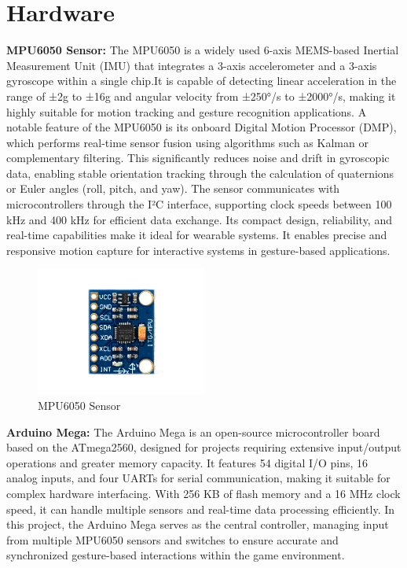 \section{Hardware}

\textbf{MPU6050 Sensor:} The MPU6050 is a widely used 6-axis MEMS-based Inertial Measurement Unit (IMU) that integrates a 3-axis accelerometer and a 3-axis gyroscope within a single chip.It is capable of detecting linear acceleration in the range of ±2g to ±16g and angular velocity from ±250°/s to ±2000°/s, making it highly suitable for motion tracking and gesture recognition applications. A notable feature of the MPU6050 is its onboard Digital Motion Processor (DMP), which performs real-time sensor fusion using algorithms such as Kalman or complementary filtering. This significantly reduces noise and drift in gyroscopic data, enabling stable orientation tracking through the calculation of quaternions or Euler angles (roll, pitch, and yaw). The sensor communicates with microcontrollers through the I²C interface, supporting clock speeds between 100 kHz and 400 kHz for efficient data exchange. Its compact design, reliability, and real-time capabilities make it ideal for wearable systems. It enables precise and responsive motion capture for interactive systems in gesture-based applications.

\begin{figure}[htbp!]
\centering
\includegraphics[width=0.5\textwidth]{images/3.1.png}
\caption{MPU6050 Sensor}
\label{fig:3.1}
\end{figure}

\vspace{1.5\baselineskip} %

\textbf{Arduino Mega:} The Arduino Mega is an open-source microcontroller board based on the ATmega2560, designed for projects requiring extensive input/output operations and greater memory capacity. It features 54 digital I/O pins, 16 analog inputs, and four UARTs for serial communication, making it suitable for complex hardware interfacing. With 256 KB of flash memory and a 16 MHz clock speed, it can handle multiple sensors and real-time data processing efficiently. In this project, the Arduino Mega serves as the central controller, managing input from multiple MPU6050 sensors and switches to ensure accurate and synchronized gesture-based interactions within the game environment.

